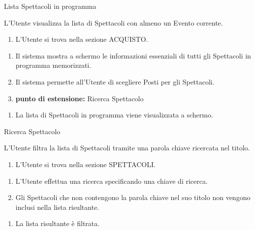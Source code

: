 {\ucTable	%
	{	%
		Lista Spettacoli in programma
		
	}{	%
		
	}{	%
		L'Utente visualizza la lista di Spettacoli con almeno un Evento corrente.
		
	}{	%
		\attori
	}{	%
		\begin{enumerate}
			\item L'Utente si trova nella sezione ACQUISTO.
		\end{enumerate}
		
	}{	%
		\begin{enumerate}
			\item Il sistema mostra a schermo le informazioni essenziali di tutti gli Spettacoli in programma memorizzati.
            \item Il sistema permette all'Utente di scegliere Posti per gli Spettacoli.
            \item[] \textbf{punto di estensione:} Ricerca Spettacolo
		\end{enumerate}
		
	}{	%
		\begin{enumerate}
			\item La lista di Spettacoli in programma viene visualizzata a schermo.
		\end{enumerate}
		
	}{	%
} }


{\ucExtTable	%
	{	%
		Ricerca Spettacolo
		
	}{	%
		
	}{	%
		L'Utente filtra la lista di Spettacoli tramite una parola chiave ricercata nel titolo.
		
	}{	%
		\attori
	}{	%
		\begin{enumerate}
			\item L'Utente si trova nella sezione SPETTACOLI.
		\end{enumerate}
		
	}{	%
		\begin{enumerate}
			\item L'Utente effettua una ricerca specificando una chiave di ricerca.
            \item Gli Spettacoli che non contengono la parola chiave nel suo titolo non vengono inclusi nella lista risultante.
		\end{enumerate}
		
	}{	%
		\begin{enumerate}
			\item La lista risultante è filtrata.
		\end{enumerate}	
} }


